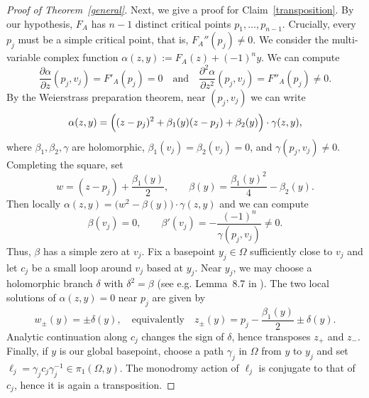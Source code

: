 \documentclass[11pt]{article}
\theoremstyle{definition}
\begin{document}
\begin{proof}[Proof of Theorem~\ref{general}]
  Next, we give a proof for Claim~\ref{transposition}. By our hypothesis, $F_A$ has $n-1$ distinct critical points $p_1,\dots,p_{n-1}$. Crucially, every $p_j$ must be a simple critical point, that is, $F_A''(p_j) \neq 0$. We consider the multi-variable complex function $\alpha(z,y) := F_A(z) + (-1)^n y$. We can compute
  \begin{equation*}
    \frac{\partial \alpha}{\partial z}(p_j,v_j) = F'_A(p_j) = 0 \quad\text{and}\quad \frac{\partial^2 \alpha}{\partial z^2}(p_j,v_j) = F''_A(p_j) \neq 0.
  \end{equation*}
  By the Weierstrass preparation theorem, near $(p_j,v_j)$ we can write
  \[
    \alpha(z,y)=\Bigl((z-p_j)^2+\beta_1(y)(z-p_j)+\beta_2(y)\Bigr)\cdot \gamma(z,y),
  \]
  where $\beta_1,\beta_2,\gamma$ are holomorphic, $\beta_1(v_j)=\beta_2(v_j)=0$, and $\gamma(p_j,v_j)\neq 0$.
  Completing the square, set
  \[
    w=(z-p_j)+\frac{\beta_1(y)}{2},
    \qquad
    \beta(y)=\frac{\beta_1(y)^2}{4}-\beta_2(y).
  \]
  Then locally $\alpha(z,y)=\bigl(w^2-\beta(y)\bigr)\cdot \gamma(z,y)$ and we can compute
  \[
    \beta(v_j)=0,
    \qquad \beta'(v_j)=-\frac{(-1)^n}{\gamma(p_j,v_j)}\neq 0.
  \]
  Thus, $\beta$ has a simple zero at $v_j$.
  Fix a basepoint $y_j\in\Omega$ sufficiently close to $v_j$ and let $c_j$ be a small loop around $v_j$ based at $y_j$.
  Near $y_j$, we may choose a holomorphic branch $\delta$ with $\delta^2=\beta$ (see e.g. Lemma~8.7 in \cite{forster1981lectures}). The two local solutions of $\alpha(z,y)=0$ near $p_j$ are given by
  \[
    w_{\pm}(y)=\pm \delta(y),
    \quad\text{equivalently}\quad
    z_\pm(y)=p_j-\frac{\beta_1(y)}{2}\pm \delta(y).
  \]
  Analytic continuation along $c_j$ changes the sign of $\delta$, hence transposes $z_+$ and $z_-$.
  Finally, if $y$ is our global basepoint, choose a path $\gamma_j$ in $\Omega$ from $y$ to $y_j$ and set $\ell_j=\gamma_j c_j \gamma_j^{-1}\in\pi_1(\Omega,y)$.
  The monodromy action of $\ell_j$ is conjugate to that of $c_j$, hence it is again a transposition.


\end{proof}
\end{document}
